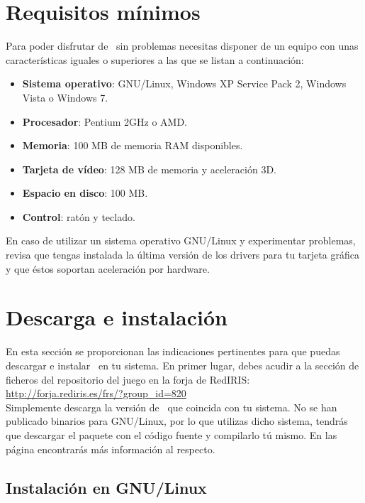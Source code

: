 \section*{Requisitos mínimos}

Para poder disfrutar de \juego\ sin problemas necesitas disponer de un equipo
con unas características iguales o superiores a las que se listan a
continuación:

\begin{itemize}
    \itemsep0em
    \item \textbf{Sistema operativo}: GNU/Linux, Windows XP Service Pack
    2, Windows Vista o Windows 7.
    \item \textbf{Procesador}: Pentium 2GHz o AMD.
    \item \textbf{Memoria}: 100 MB de memoria RAM disponibles.
    \item \textbf{Tarjeta de vídeo}: 128 MB de memoria y aceleración 3D.
    \item \textbf{Espacio en disco}: 100 MB.
    \item \textbf{Control}: ratón y teclado.
\end{itemize}

En caso de utilizar un sistema operativo GNU/Linux y experimentar problemas,
revisa que tengas instalada la última versión de los drivers para tu
tarjeta gráfica y que éstos soportan aceleración por hardware.

\section*{Descarga e instalación}
En esta sección se proporcionan las indicaciones pertinentes para que puedas
descargar e instalar \juego\ en tu sistema. En primer lugar, debes acudir
a la sección de ficheros del repositorio del juego en la forja de RedIRIS:\\

\url{http://forja.rediris.es/frs/?group_id=820}\\

Simplemente descarga la versión de \juego\ que coincida con tu sistema. 
No se han publicado binarios para GNU/Linux, por lo que utilizas dicho sistema,
tendrás que descargar el paquete con el código fuente y compilarlo tú mismo.
En las página \pageref{sec:instalacion-linux} encontrarás más información
al respecto.

\subsection*{Instalación en GNU/Linux}
\label{sec:instalacion-linux}

